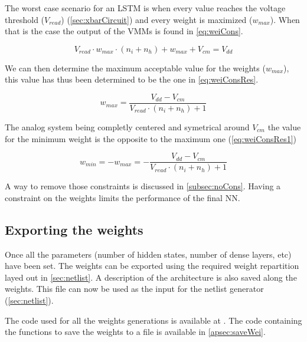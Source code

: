 The worst case scenario for an \ac{LSTM} is when every value reaches the voltage threshold ($V_{read}$) (\cref{sec:xbarCircuit}) and every weight is maximized ($w_{max}$). When that is the case the output of the \acp{VMM} is found in \cref{eq:weiCons}.

\begin{equation}\label{eq:weiCons}
  V_{read}\cdot w_{max} \cdot(n_i+n_h)+w_{max}+V_{cm}= V_{dd}
\end{equation}

We can then determine the maximum acceptable value for the weights ($w_{max}$), this value has thus been determined to be the one in \cref{eq:weiConsRes}.

\begin{equation}\label{eq:weiConsRes}
  w_{max}=\frac{V_{dd}-V_{cm}}{V_{read}\cdot(n_i+n_h)+1}
\end{equation}

The analog system being completly centered and symetrical around $V_{cm}$ the value for the minimum weight is the opposite to the maximum one (\cref{eq:weiConsRes1})

\begin{equation}\label{eq:weiConsRes1}
  w_{min}=-w_{max}=-\frac{V_{dd}-V_{cm}}{V_{read}\cdot(n_i+n_h)+1}
\end{equation}

A way to remove those constraints is discussed in \cref{subsec:noCons}. Having a constraint on the weights limits the performance of the final \ac{NN}.

\subsection{Exporting the weights}

Once all the parameters (number of hidden states, number of dense layers, etc) have been set. The weights can be exported using the required weight repartition layed out in \cref{sec:netlist}. A description of the architecture is also saved along the weights. This file can now be used as the input for the netlist generator (\cref{sec:netlist}).

The code used for all the weights generations is available at \cite{lstmWei}. The code containing the functions to save the weights to a file is available in \cref{apsec:saveWei}.
